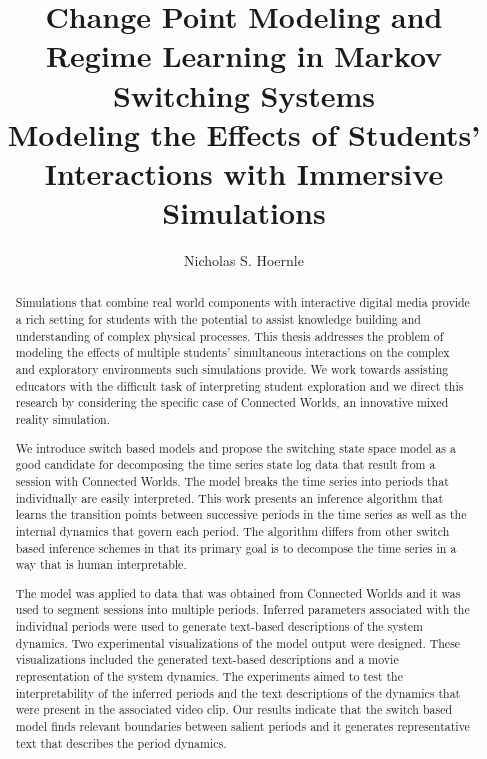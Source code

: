 \documentclass[11pt]{gsasthesis} %
\title{Change Point Modeling and Regime Learning in Markov Switching Systems \\
\large Modeling the Effects of Students' Interactions with Immersive Simulations} %
\author{Nicholas S. Hoernle} %
\begin{document}


\thesistitlepage
\begin{abstract}
Simulations that combine real world components with interactive digital media provide a rich setting for students with the potential to assist knowledge building and understanding of complex physical processes. This thesis addresses the problem of modeling the effects of multiple students' simultaneous interactions on the complex and exploratory environments such simulations provide. We work towards assisting educators with the difficult task of interpreting student exploration and we direct this research by considering the specific case of Connected Worlds, an innovative mixed reality simulation.


We introduce switch based models and propose the switching state space model as a good candidate for decomposing the time series state log data that result from a session with Connected Worlds. The model breaks the time series into periods that individually are easily interpreted. This work presents an inference algorithm that learns the transition points between successive periods in the time series as well as the internal dynamics that govern each period. The algorithm differs from other switch based inference schemes in that its primary goal is to decompose the time series in a way that is human interpretable.

The model was applied to data that was obtained from Connected Worlds and it was used to segment sessions into multiple periods. Inferred parameters associated with the individual periods were used to generate text-based descriptions of the system dynamics. Two experimental visualizations of the model output were designed. These visualizations included the generated text-based descriptions and a movie representation of the system dynamics. The experiments aimed to test the interpretability of the inferred periods and the text descriptions of the dynamics that were present in the associated video clip. Our results indicate that the switch based model finds relevant boundaries between salient periods and it generates representative text that describes the period dynamics.
\end{abstract}
\end{document}
